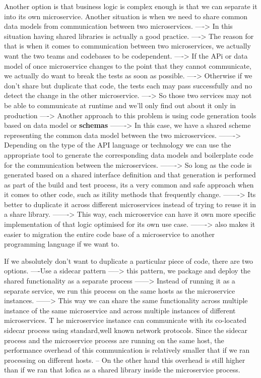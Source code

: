 \documentclass[a4paper, 11pt]{book}
\begin{document}
    Another option is that business logic is complex enough is that we can separate it into its own microservice.
    Another situation is when we need to share common data models from communication between two microservices.
    ----> In this situation having shared libraries is actually a good practice.
    ----> The reason for that is when it comes to communication between two microservices, we actually want the two teams and codebases to be codependent.
    ----> If the APi or data model of once microservice changes to the point that they cannot communicate, we actually do want to break the tests as soon as possible.
    ----> Otherwise if we don't share but duplicate that code, the tests each may pass successfully and no detect the change in the other microservice.
    ----> So those two services may not be able to communicate at runtime and we'll only find out about it only in production
    ----> Another approach to this problem is using code generation tools based on data model or \textbf{schemas}
    -------> In this case, we have a shared scheme representing the common data model between the two microservices.
    -------> Depending on the type of the API language or technology we can use the appropriate tool to generate the corresponding data models and boilerplate code for the communication between the microservices.
    -------> So long as the code is generated based on a shared interface definition and that generation is performed as part of the build and test process, its a very common and safe approach when it comes to other code, such as itility methods that frequently change.
    -------> Its better to duplicate it across different microservices instead of trying to reuse it in a share library.
    -------> This way, each microservice can have it own more specific implementation of that logic optimised for its own use case.
    -------> also makes it easier to migration the entire code base of a microservice to another programming language if we want to.

    If we absolutely don't want to duplicate a particular piece of code, there are two options.
    ----Use a sidecar pattern
    -----> this pattern, we package and deploy the shared functionality as a separate process
    ------> Instead of running it as a separate service, we run this process on the same hosts as the microservice instances.
    ------> This way we can share the same functionality across multiple instance of the same microservice and across multiple instances of different microservices.
    T he microservice instance can communicate with its co-located sidecar process using standard,well known network protocols.
    Since the sidecar process and the microservice process are running on the same host, the performance overhead of this communication is relatively smaller that if we ran processing on different hosts.
    -- On the other hand this overhead is still higher than if we ran that lofica as a shared library inside the microservice process.
\end{document}
